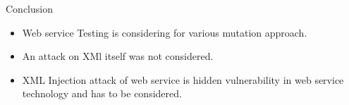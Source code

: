 \documentclass[10pt]{beamer}
\begin{document}
%
%
%	


 {\1
 	\begin{frame}
 		\begin{block}{}
 			
 		\end{block}
 	\end{frame}}
\begin{frame}{Conclusion}{}
	\begin{block}{}


	\begin{itemize}
		\item Web service Testing is considering for various mutation approach.
		\item An attack on XMl itself was not considered.
		\item XML Injection attack of web service is hidden vulnerability in web service technology and has to be considered.
		
		
	\end{itemize}
		\end{block}
\end{frame}
\end{document}

